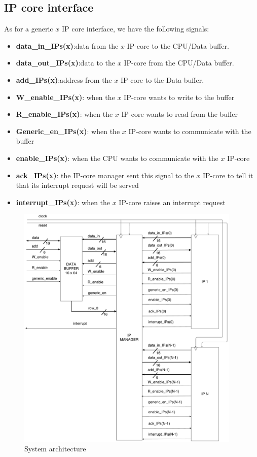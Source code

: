 \subsection{IP core interface}
	As for a generic $ x $ IP core interface, we have the following signals:
	\begin{itemize}
	\item \textbf{data\_in\_IPs(x)}:data from the $ x $ IP-core to the CPU/Data buffer.
\item \textbf{data\_out\_IPs(x)}:data to the $ x $ IP-core from the CPU/Data buffer.
\item \textbf{add\_IPs(x)}:address from the $ x $ IP-core to the Data buffer.
\item \textbf{W\_enable\_IPs(x)}: when the $ x $ IP-core wants to write to the buffer
\item \textbf{R\_enable\_IPs(x)}: when the $ x $ IP-core wants to read from the buffer
\item \textbf{Generic\_en\_IPs(x)}: when the $ x $ IP-core wants to communicate with the buffer	
\item \textbf{enable\_IPs(x)}: when the CPU wants to communicate with the $ x $ IP-core
\item \textbf{ack\_IPs(x)}: the IP-core manager sent this signal to the $ x $ IP-core to tell it that its interrupt request will be served
\item \textbf{interrupt\_IPs(x)}: when the $ x $ IP-core raises an interrupt request
\end{itemize}
	\begin{figure}[h]
		\centering
		\includegraphics[width=0.95\textwidth]{chapters/figures/interface.pdf}  
		\caption{System architecture}
		\label{00fig}
	\end{figure}
\clearpage
\newpage
